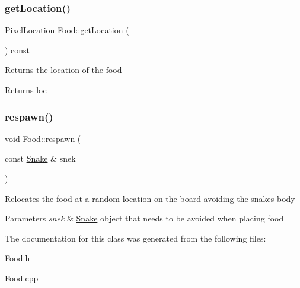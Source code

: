 \subsubsection{\texorpdfstring{get\+Location()}{getLocation()}}
{\footnotesize\ttfamily \hyperlink{class_pixel_location}{Pixel\+Location} Food\+::get\+Location (\begin{DoxyParamCaption}{ }\end{DoxyParamCaption}) const}

Returns the location of the food

\begin{DoxyReturn}{Returns}
loc 
\end{DoxyReturn}
\mbox{\label{class_food_afcd8485cf59e61adcc28cfc237bf3001}} 
\subsubsection{\texorpdfstring{respawn()}{respawn()}}
{\footnotesize\ttfamily void Food\+::respawn (\begin{DoxyParamCaption}\item[{const \hyperlink{class_snake}{Snake} \&}]{snek }\end{DoxyParamCaption})}

Relocates the food at a random location on the board avoiding the snake\textquotesingle{}s body


\begin{DoxyParams}{Parameters}
{\em snek} & \hyperlink{class_snake}{Snake} object that needs to be avoided when placing food \\
\hline
\end{DoxyParams}


The documentation for this class was generated from the following files\+:\begin{DoxyCompactItemize}
\item 
Food.\+h\item 
Food.\+cpp\end{DoxyCompactItemize}
